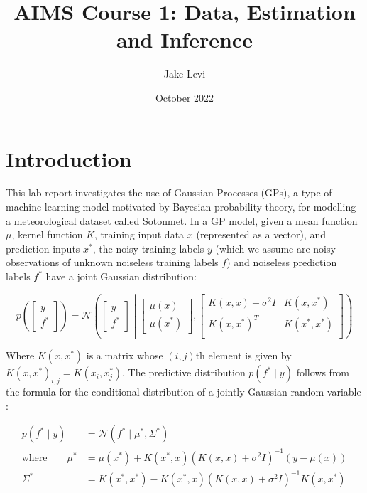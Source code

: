 \documentclass{article}
\title{AIMS Course 1: Data, Estimation and Inference}
\author{Jake Levi}
\date{October 2022}
\begin{document}
\maketitle


\section{Introduction}

This lab report investigates the use of Gaussian Processes (GPs), a type of machine learning model motivated by Bayesian probability theory, for modelling a meteorological dataset called Sotonmet. In a GP model, given a mean function $\mu$, kernel function $K$, training input data $x$ (represented as a vector), and prediction inputs $x^*$, the noisy training labels $y$ (which we assume are noisy observations of unknown noiseless training labels $f$) and noiseless prediction labels $f^*$ have a joint Gaussian distribution:


\begin{equation}
    p\left( \begin{bmatrix}
        y \\
        f^*
    \end{bmatrix} \right)
    = \mathcal{N} \left( \begin{bmatrix}
        y \\
        f^*
    \end{bmatrix} \middle| \begin{bmatrix}
        \mu(x) \\
        \mu(x^*)
    \end{bmatrix}, \begin{bmatrix}
        K(x, x) + \sigma^2 I & K(x, x^*) \\
        K(x, x^*)^T & K(x^*, x^*) \\
    \end{bmatrix} \right)
\end{equation}

Where $K(x, x^*)$ is a matrix whose $(i, j)$th element is given by $K(x, x^*)_{i,j} = K(x_i, x^*_j)$. The predictive distribution $p(f^* \mid y)$ follows from the formula for the conditional distribution of a jointly Gaussian random variable \cite{bishop2006pattern}:


\begin{align}
    p(f^* \mid y) &= \mathcal{N}\left(f^* \mid \mu^*, \Sigma^* \right) \\
    \text{where} \qquad \mu^* &= \mu(x^*) + K(x^*, x) \left( K(x, x) + \sigma^2 I \right)^{-1} (y - \mu(x)) \\
    \Sigma^* &= K(x^*, x^*) - K(x^*, x) \left( K(x, x) + \sigma^2 I \right) ^{-1} K(x, x^*)
\end{align}
\end{document}
